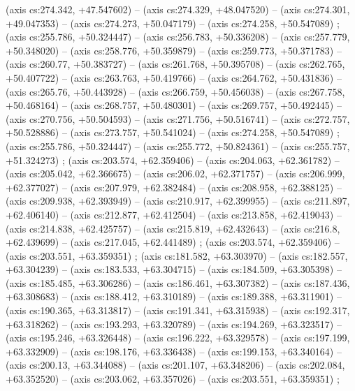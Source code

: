     (axis cs:274.342,    +47.547602) --  (axis cs:274.329,    +48.047520) --  (axis cs:274.301,    +49.047353) --  (axis cs:274.273,    +50.047179) --  (axis cs:274.258,    +50.547089) ;
    (axis cs:255.786,    +50.324447) --  (axis cs:256.783,    +50.336208) --  (axis cs:257.779,    +50.348020) --  (axis cs:258.776,    +50.359879) --  (axis cs:259.773,    +50.371783) --  (axis cs:260.77,    +50.383727) --  (axis cs:261.768,    +50.395708) --  (axis cs:262.765,    +50.407722) --  (axis cs:263.763,    +50.419766) --  (axis cs:264.762,    +50.431836) --  (axis cs:265.76,    +50.443928) --  (axis cs:266.759,    +50.456038) --  (axis cs:267.758,    +50.468164) --  (axis cs:268.757,    +50.480301) --  (axis cs:269.757,    +50.492445) --  (axis cs:270.756,    +50.504593) --  (axis cs:271.756,    +50.516741) --  (axis cs:272.757,    +50.528886) --  (axis cs:273.757,    +50.541024) --  (axis cs:274.258,    +50.547089) ;
    (axis cs:255.786,    +50.324447) --  (axis cs:255.772,    +50.824361) --  (axis cs:255.757,    +51.324273) ;
    (axis cs:203.574,    +62.359406) --  (axis cs:204.063,    +62.361782) --  (axis cs:205.042,    +62.366675) --  (axis cs:206.02,    +62.371757) --  (axis cs:206.999,    +62.377027) --  (axis cs:207.979,    +62.382484) --  (axis cs:208.958,    +62.388125) --  (axis cs:209.938,    +62.393949) --  (axis cs:210.917,    +62.399955) --  (axis cs:211.897,    +62.406140) --  (axis cs:212.877,    +62.412504) --  (axis cs:213.858,    +62.419043) --  (axis cs:214.838,    +62.425757) --  (axis cs:215.819,    +62.432643) --  (axis cs:216.8,    +62.439699) --  (axis cs:217.045,    +62.441489) ;
    (axis cs:203.574,    +62.359406) --  (axis cs:203.551,    +63.359351) ;
    (axis cs:181.582,    +63.303970) --  (axis cs:182.557,    +63.304239) --  (axis cs:183.533,    +63.304715) --  (axis cs:184.509,    +63.305398) --  (axis cs:185.485,    +63.306286) --  (axis cs:186.461,    +63.307382) --  (axis cs:187.436,    +63.308683) --  (axis cs:188.412,    +63.310189) --  (axis cs:189.388,    +63.311901) --  (axis cs:190.365,    +63.313817) --  (axis cs:191.341,    +63.315938) --  (axis cs:192.317,    +63.318262) --  (axis cs:193.293,    +63.320789) --  (axis cs:194.269,    +63.323517) --  (axis cs:195.246,    +63.326448) --  (axis cs:196.222,    +63.329578) --  (axis cs:197.199,    +63.332909) --  (axis cs:198.176,    +63.336438) --  (axis cs:199.153,    +63.340164) --  (axis cs:200.13,    +63.344088) --  (axis cs:201.107,    +63.348206) --  (axis cs:202.084,    +63.352520) --  (axis cs:203.062,    +63.357026) --  (axis cs:203.551,    +63.359351) ;
